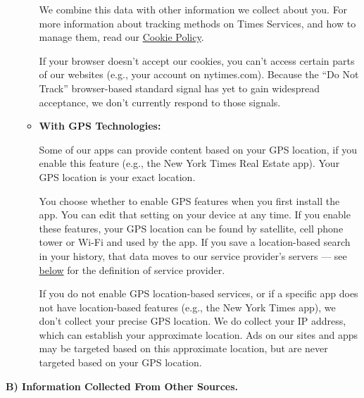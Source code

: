 \begin{enumerate}
\begin{itemize}
    We combine this data with other information we collect about you.
    For more information about tracking methods on Times Services, and
    how to manage them, read our
    \href{https://www.nytimes.com/subscription/dg-cookie-policy/cookie-policy.html}{Cookie
    Policy}.

    If your browser doesn't accept our cookies, you can't access certain
    parts of our websites (e.g., your account on nytimes.com). Because
    the ``Do Not Track'' browser-based standard signal has yet to gain
    widespread acceptance, we don't currently respond to those signals.
  \item
    \textbf{With GPS Technologies:}

    Some of our apps can provide content based on your GPS location, if
    you enable this feature (e.g., the New York Times Real Estate app).
    Your GPS location is your exact location.

    You choose whether to enable GPS features when you first install the
    app. You can edit that setting on your device at any time. If you
    enable these features, your GPS location can be found by satellite,
    cell phone tower or Wi-Fi and used by the app. If you save a
    location-based search in your history, that data moves to our
    service provider's servers --- see
    \protect\hyperlink{anchor-question2-sectionE}{below} for the
    definition of service provider.

    If you do not enable GPS location-based services, or if a specific
    app does not have location-based features (e.g., the New York Times
    app), we don't collect your precise GPS location. We do collect your
    IP address, which can establish your approximate location. Ads on
    our sites and apps may be targeted based on this approximate
    location, but are never targeted based on your GPS location.
  \end{itemize}
\end{enumerate}

\textbf{B) Information Collected From Other Sources.}

